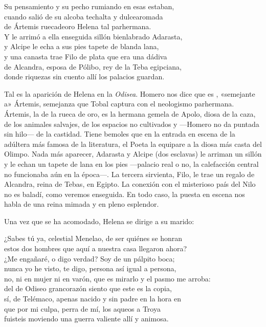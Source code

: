 \begin{versocita}
Su pensamiento y su pecho rumiando en esas estaban,\\
cuando salió de su alcoba techalta y dulcearomada\\
de Ártemis ruecadeoro Helena tal parhermana.\\
Y le arrimó a ella enseguida sillón bienlabrado Adarasta,\\
y Alcipe le echa a sus pies tapete de blanda lana,\\
y una canasta trae Filo de plata que era una dádiva\\
de Alcandra, esposa de Pólibo, rey de la Teba egipciana,\\
donde riquezas sin cuento allí los palacios guardan.
\end{versocita}

Tal es la aparición de Helena en la \emph{Odisea}. Homero nos dice que es , «semejante a» Ártemis, semejanza que Tobal captura con el neologismo parhermana. Ártemis, la de la rueca de oro, es la hermana gemela de Apolo, diosa de la caza, de los animales salvajes, de los espacios no cultivados y ---Homero no da puntada sin hilo--- de la castidad. Tiene bemoles que en la entrada en escena de la adúltera más famosa de la literatura, el Poeta la equipare a la diosa más casta del Olimpo. Nada más aparecer, Adarasta y Alcipe (dos esclavas) le arriman un sillón y le echan un tapete de lana en los pies ---palacio real o no, la calefacción central no funcionaba aún en la época---. La tercera sirvienta, Filo, le trae un regalo de Alcandra, reina de Tebas, en Egipto. La conexión con el misterioso país del Nilo no es baladí, como veremos enseguida. En todo caso, la puesta en escena nos habla de una reina mimada y en pleno esplendor.

Una vez que se ha acomodado, Helena se dirige a su marido:

\begin{versocita}
¿Sabes tú ya, celestial Menelao, de ser quiénes se honran\\
estos dos hombres que aquí a nuestra casa llegaron ahora?\\
¿Me engañaré, o digo verdad? Soy de un pálpito boca;\\
nunca yo he visto, te digo, persona así igual a persona,\\
no, ni en mujer ni en varón, que es mirarlo y el pasmo me arroba:\\
del de Odiseo grancorazón siento que este es la copia,\\
sí, de Telémaco, apenas nacido y sin padre en la hora en\\
que por mi culpa, perra de mí, los aqueos a Troya\\
fuisteis moviendo una guerra valiente allí y animosa.
\end{versocita}

